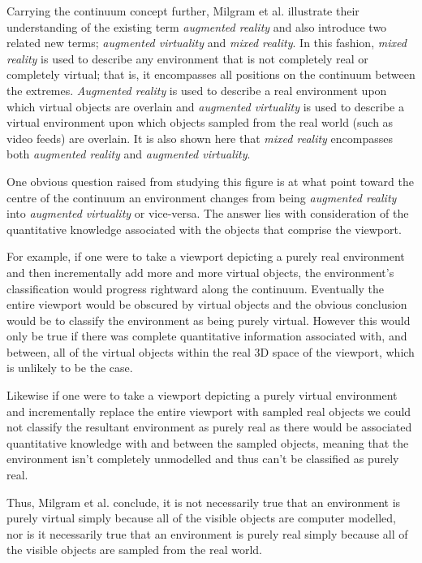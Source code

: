Carrying the continuum concept further, Milgram et al. illustrate their understanding of the existing term \textit{augmented reality} and also introduce two related new terms; \textit{augmented virtuality} and \textit{mixed reality}. In this fashion, \textit{mixed reality} is used to describe any environment that is not completely real or completely virtual; that is, it encompasses all positions on the continuum between the extremes. \textit{Augmented reality} is used to describe a real environment upon which virtual objects are overlain and \textit{augmented virtuality} is used to describe a virtual environment upon which objects sampled from the real world (such as video feeds) are overlain. It is also shown here that \textit{mixed reality} encompasses both \textit{augmented reality} and \textit{augmented virtuality}.

One obvious question raised from studying this figure is at what point toward the centre of the continuum an environment changes from being \textit{augmented reality} into \textit{augmented virtuality} or vice-versa. The answer lies with consideration of the quantitative knowledge associated with the objects that comprise the viewport.

For example, if one were to take a viewport depicting a purely real environment and then incrementally add more and more virtual objects, the environment's classification would progress rightward along the continuum. Eventually the entire viewport would be obscured by virtual objects and the obvious conclusion would be to classify the environment as being purely virtual. However this would only be true if there was complete quantitative information associated with, and between, all of the virtual objects within the real 3D space of the viewport, which is unlikely to be the case.

Likewise if one were to take a viewport depicting a purely virtual environment and incrementally replace the entire viewport with sampled real objects we could not classify the resultant environment as purely real as there would be associated quantitative knowledge with and between the sampled objects, meaning that the environment isn't completely unmodelled and thus can't be classified as purely real.


Thus, Milgram et al. conclude, it is not necessarily true that an environment is purely virtual simply because all of the visible objects are computer modelled, nor is it necessarily true that an environment is purely real simply because all of the visible objects are sampled from the real world.


